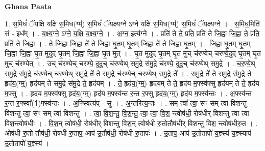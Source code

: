 \documentclass[17pt]{extarticle}
\begin{document}
\textbf{Ghana Paata } \newline

1. स॒मिधं॑ ॅयक्षि यक्षि स॒मिध(ग्म्॑) स॒मिधं॑ ॅयक्ष्यग्ने ऽग्ने यक्षि स॒मिध(ग्म्॑) स॒मिधं॑ ॅयक्ष्यग्ने । . स॒मिध॒मिति॑ सं - इध᳚म् । . य॒क्ष्य॒ग्ने॒ ऽग्ने॒ य॒क्षि॒ य॒क्ष्य॒ग्ने॒ । . अ॒ग्न॒ इत्य॑ग्ने । . प्रति॑ ते ते॒ प्रति॒ प्रति॑ ते जि॒ह्वा जि॒ह्वा ते॒ प्रति॒ प्रति॑ ते जि॒ह्वा । . ते॒ जि॒ह्वा जि॒ह्वा ते॑ ते जि॒ह्वा घृ॒तम् घृ॒तम् जि॒ह्वा ते॑ ते जि॒ह्वा घृ॒तम् । . जि॒ह्वा घृ॒तम् घृ॒तम् जि॒ह्वा जि॒ह्वा घृ॒त मुदुद् घृ॒तम् जि॒ह्वा जि॒ह्वा घृ॒त मुत् । . घृ॒त मुदुद् घृ॒तम् घृ॒त मुच् च॑रण्येच् चरण्ये॒दुद् घृ॒तम् घृ॒त मुच् च॑रण्येत् । . उच् च॑रण्येच् चरण्ये॒ दुदुच् च॑रण्येथ् समु॒द्रे स॑मु॒द्रे च॑रण्ये॒ दुदुच् च॑रण्येथ् समु॒द्रे । . च॒र॒ण्ये॒थ् स॒मु॒द्रे स॑मु॒द्रे च॑रण्येच् चरण्येथ् समु॒द्रे ते॑ ते समु॒द्रे च॑रण्येच् चरण्येथ् समु॒द्रे ते᳚ । . स॒मु॒द्रे ते॑ ते समु॒द्रे स॑मु॒द्रे ते॒ हृद॑य॒(ग्म्॒) हृद॑यम् ते समु॒द्रे स॑मु॒द्रे ते॒ हृद॑यम् । . ते॒ हृद॑य॒(ग्म्॒) हृद॑यम् ते ते॒ हृद॑य म॒फ्स्व॑फ्सु हृद॑यम् ते ते॒ हृद॑य म॒फ्सु । . हृद॑य म॒फ्स्व॑फ्सु हृद॑य॒(ग्म्॒) हृद॑य म॒फ्स्व॑न्त र॒न्त र॒फ्सु हृद॑य॒(ग्म्॒) हृद॑य म॒फ्स्व॑न्तः । . अ॒फ्स्व॑न्त र॒न्त र॒फ्स्वा᳚(1॒)फ्स्व॑न्तः । . अ॒फ्स्वित्य॑प् - सु । . अ॒न्तरित्य॒न्तः । . सम् त्वा᳚ त्वा॒ सꣳ सम् त्वा॑ विशन्तु विशन्तु त्वा॒ सꣳ सम् त्वा॑ विशन्तु । . त्वा॒ वि॒श॒न्तु॒ वि॒श॒न्तु॒ त्वा॒ त्वा॒ वि॒श॒ न्त्वोष॑धी॒ रोष॑धीर् विशन्तु त्वा त्वा विश॒न्त्वोष॑धीः । . वि॒श॒न् त्वोष॑धी॒ रोष॑धीर् विशन्तु विश॒न् त्वोष॑धी रु॒तोतौष॑धीर् विशन्तु विश॒ न्त्वोष॑धीरु॒त । . ओष॑धी रु॒तो तौष॑धी॒ रोष॑धी रु॒ताप॒ आप॑ उ॒तौष॑धी॒ रोष॑धी रु॒तापः॑ । . उ॒ताप॒ आप॑ उ॒तोतापो॑ य॒ज्ञ्स्य॑ य॒ज्ञ्स्याप॑ उ॒तोतापो॑ य॒ज्ञ्स्य॑ । \newline
\end{document}
